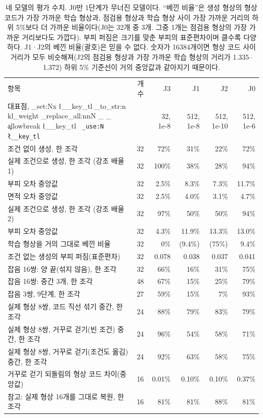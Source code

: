 \documentclass[11pt]{article}
\DeclareRobustCommand{\key}[1]{
  \tl_set:Nx \l__key_tl { \tl_to_str:n {#1} }
  \regex_replace_all:nnN { \_ } { \cO\_ \c{allowbreak} } \l__key_tl
  \texttt{ \tl_use:N \l__key_tl }
}
\begin{document}
\begin{table}[htbp]
\centering\small\setlength{\tabcolsep}{4pt}
\begin{tabular}{l r r r r r}
\toprule
항목 & 개수 & J3 & J1 & J2 & J0 \\
\quad 대표점, \key{kl_weight} & & 32, 1e-8 & 512, 1e-8 & 512, 1e-10 & 512, 1e-6 \\
\midrule
조건 없이 생성, 한 조각 & 32 & 72\% & 31\% & 22\% & 72\% \\
실제 조건으로 생성, 한 조각 (강조 배율 1) & 32 & 100\% & 38\% & 28\% & 94\% \\
\quad 부피 오차 중앙값 & 32 & 2.5\% & 8.3\% & 7.3\% & 11.7\% \\
\quad 면적 오차 중앙값 & 32 & 2.5\% & 4.0\% & 3.1\% & 4.7\% \\
실제 조건으로 생성, 한 조각 (강조 배율 2) & 32 & 97\% & 50\% & 50\% & 94\% \\
\quad 부피 오차 중앙값 & 32 & 4.3\% & 11.9\% & 13.3\% & 13.0\% \\
학습 형상을 거의 그대로 베낀 비율 & 32 & 0\% & (9.4\%) & (75\%) & 9.4\% \\
조건 없는 생성의 부피 퍼짐(표준편차) & 32 & 0.078 & 0.038 & 0.037 & 0.041 \\
\midrule
잡음 16쌍: 양 끝(섞지 않음), 한 조각 & 32 & 66\% & 16\% & 31\% & 75\% \\
잡음 16쌍: 중간 3개, 한 조각 & 48 & 67\% & 15\% & 25\% & 79\% \\
잡음 3쌍, 9단계, 한 조각 & 27 & 59\% & 15\% & 7\% & 93\% \\
실제 형상 8쌍, 코드 직선 섞기 중간, 한 조각 & 24 & 88\% & 79\% & 83\% & 79\% \\
실제 형상 8쌍, 거꾸로 걷기(빈 조건) 중간, 한 조각 & 24 & 96\% & 54\% & 58\% & 71\% \\
실제 형상 8쌍, 거꾸로 걷기(조건도 옮김) 중간, 한 조각 & 24 & 92\% & 63\% & 58\% & 75\% \\
거꾸로 걷기 되돌림의 형상 코드 차이(중앙값) & 16 & 0.01\% & 0.10\% & 0.10\% & 0.37\% \\
참고: 실제 형상 16개를 그대로 복원, 한 조각 & 16 & 81\% & 81\% & 88\% & 81\% \\
\bottomrule
\end{tabular}
\caption{네 모델의 평가 수치. J0만 1단계가 무너진 모델이다. ``베낀 비율''은 생성 형상의 형상 코드가 가장 가까운 학습 형상과, 점검용 형상과 학습 형상 사이 가장 가까운 거리의
하위 5\%보다 더 가까운 비율이다(J0는 32개 중 3개. 그중 1개는 점검용 형상의 가장 가까운 거리보다도 가깝다). 부피 퍼짐은 크기를 맞춘 부피의 표준편차이며 클수록 다양하다.
J1·J2의 베낀 비율(괄호)은 믿을 수 없다. 숫자가 16384개이면 형상 코드 사이 거리가 모두 비슷해져(J2의 점검용 형상과 가장 가까운 학습 형상의 거리가
1.335--1.372) 하위 5\% 기준선이 거의 중앙값과 같아지기 때문이다.}
\label{tab:jebeval}
\end{table}
\end{document}
